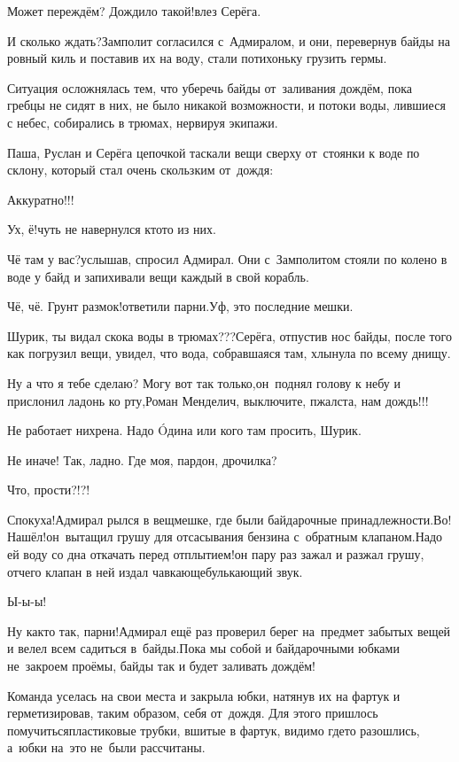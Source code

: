 \diagdash Может переждём? Дождило такой!\mdash влез Серёга.

\diagdash И сколько ждать?\mdash Замполит согласился с~Адмиралом, и они, перевернув байды на ровный киль и поставив их на воду, стали потихоньку грузить гермы. 

Ситуация осложнялась тем, что уберечь байды от~заливания дождём, пока гребцы не сидят в них, не было никакой возможности, и потоки воды, лившиеся с небес, собирались в трюмах, нервируя экипажи.

Паша, Руслан и Серёга цепочкой таскали вещи сверху от~стоянки к воде по склону, который стал очень скользким от~дождя:

\diagdash Аккуратно!!!

\diagdash Ух, ё!\mdash чуть не навернулся кто\sdash то из них.

\diagdash Чё там у вас?\mdash услышав, спросил Адмирал. Они с~Замполитом стояли по колено в воде у байд и запихивали вещи каждый в свой корабль.

\diagdash Чё, чё. Грунт размок!\mdash ответили парни.\mdash Уф, это последние мешки.

\diagdash Шурик, ты видал скока воды в трюмах???\mdash Серёга, отпустив нос байды, после того как погрузил вещи, увидел, что вода, собравшаяся там, хлынула по всему днищу.

\diagdash Ну а что я тебе сделаю? Могу вот так только,\mdash он~поднял голову к небу и прислонил ладонь ко рту,\mdash Роман Менделич, выключите, п\sdash жалста, нам дождь!!!

\diagdash Не работает нихрена. Надо {\'{O}}дина или кого там просить, Шурик.

\diagdash Не иначе! Так, ладно. Где моя, пардон, дрочилка?

\diagdash Что, прости?!?!

\diagdash Спокуха!\mdash Адмирал рылся в вещмешке, где были байдарочные принадлежности.\mdash Во! Нашёл!\mdash он~вытащил грушу для отсасывания бензина с~обратным клапаном.\mdash Надо ей воду со дна откачать перед отплытием!\mdash он пару раз зажал и разжал грушу, отчего клапан в ней издал чавкающе\sdash булькающий звук.

\diagdash Ы-ы-ы! 

\diagdash Ну как\sdash то так, парни!\mdash Адмирал ещё раз проверил берег на~предмет забытых вещей и велел всем садиться в~байды.\mdash Пока мы собой и байдарочными юбками не~закроем проёмы, байды так и будет заливать дождём!

Команда уселась на свои места и закрыла юбки, натянув их на фартук и герметизировав, таким образом, себя от~дождя. Для этого пришлось помучиться\mdash пластиковые трубки, вшитые в фартук, видимо где\sdash то разошлись, а~юбки на~это не~были рассчитаны. 


